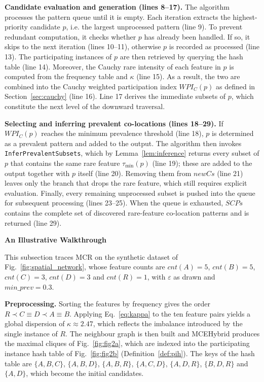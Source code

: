 \documentclass[12pt, letterpaper]{template}
\theoremstyle{definition}
\begin{document}
\noindent\textbf{Candidate evaluation and generation (lines 8--17).}
The algorithm processes the pattern queue until it is empty. Each iteration extracts the
highest-priority candidate $p$, i.e. the largest unprocessed pattern (line 9). To prevent
redundant computation, it checks whether $p$ has already been handled. If so, it skips to the
next iteration (lines 10--11), otherwise $p$ is recorded as processed (line 13). The participating
instances of $p$ are then retrieved by querying the hash table (line 14). Moreover, the Cauchy rare
intensity of each feature in $p$ is computed from the frequency table and $\kappa$ (line 15).
As a result, the two are combined into the Cauchy weighted participation index $WPI_C(p)$ as defined
in Section~\ref{sec:cauchy} (line 16). Line 17 derives the immediate subsets of $p$, which
constitute the next level of the downward traversal.

\noindent\textbf{Selecting and inferring prevalent co-locations (lines 18--29).}
If $WPI_C(p)$ reaches the minimum prevalence threshold (line 18), $p$ is determined as a
prevalent pattern and added to the output. The algorithm then invokes
\texttt{InferPrevalentSubsets}, which by Lemma~\ref{lem:inference} returns every subset of $p$ that
contains the same rare feature $\tau_{\min}(p)$ (line 19); these are added to the output together
with $p$ itself (line 20). Removing them from $newCs$
(line 21) leaves only the branch that drops the rare feature, which still requires
explicit evaluation. Finally, every remaining unprocessed subset is pushed into the queue for
subsequent processing (lines 23--25). When the queue is exhausted, $SCPs$ contains the
complete set of discovered rare-feature co-location patterns and is returned (line 29).

\noindent\textbf{An Illustrative Walkthrough}
\label{subsec:mcr_example}

This subsection traces MCR on the synthetic dataset of Fig.~\ref{fig:spatial_network},
whose feature counts are $cnt(A)=5$, $cnt(B)=5$, $cnt(C)=3$, $cnt(D)=3$ and
$cnt(R)=1$, with $\varepsilon$ as drawn and $min\_prev = 0.3$.

\noindent\textbf{Preprocessing.}
Sorting the features by frequency gives the order
$R \prec C \equiv D \prec A \equiv B$. Applying Eq.~\ref{eq:kappa} to the ten
feature pairs yields a global dispersion of $\kappa \approx 2.47$, which
reflects the imbalance introduced by the single instance
of $R$. The neighbour graph is then built and MCEHybrid produces the maximal
cliques of Fig.~\ref{fig:fig2a}, which are indexed into the participating
instance hash table of Fig.~\ref{fig:fig2b} (Definition~\ref{def:pih}). The
keys of the hash table are $\{A,B,C\}$, $\{A,B,D\}$, $\{A,B,R\}$,
$\{A,C,D\}$, $\{A,D,R\}$, $\{B,D,R\}$ and $\{A,D\}$, which become the initial
candidates.
\end{document}
